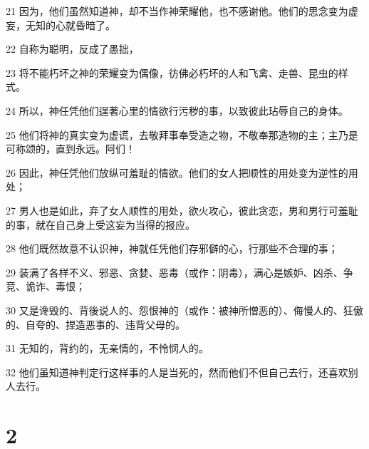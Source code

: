 \par 21 因为，他们虽然知道神，却不当作神荣耀他，也不感谢他。他们的思念变为虚妄，无知的心就昏暗了。
\par 22 自称为聪明，反成了愚拙，
\par 23 将不能朽坏之神的荣耀变为偶像，彷佛必朽坏的人和飞禽、走兽、昆虫的样式。
\par 24 所以，神任凭他们逞著心里的情欲行污秽的事，以致彼此玷辱自己的身体。
\par 25 他们将神的真实变为虚谎，去敬拜事奉受造之物，不敬奉那造物的主；主乃是可称颂的，直到永远。阿们！
\par 26 因此，神任凭他们放纵可羞耻的情欲。他们的女人把顺性的用处变为逆性的用处；
\par 27 男人也是如此，弃了女人顺性的用处，欲火攻心，彼此贪恋，男和男行可羞耻的事，就在自己身上受这妄为当得的报应。
\par 28 他们既然故意不认识神，神就任凭他们存邪僻的心，行那些不合理的事；
\par 29 装满了各样不义、邪恶、贪婪、恶毒（或作：阴毒），满心是嫉妒、凶杀、争竞、诡诈、毒恨；
\par 30 又是谗毁的、背後说人的、怨恨神的（或作：被神所憎恶的）、侮慢人的、狂傲的、自夸的、捏造恶事的、违背父母的。
\par 31 无知的，背约的，无亲情的，不怜悯人的。
\par 32 他们虽知道神判定行这样事的人是当死的，然而他们不但自己去行，还喜欢别人去行。

\chapter{2}

